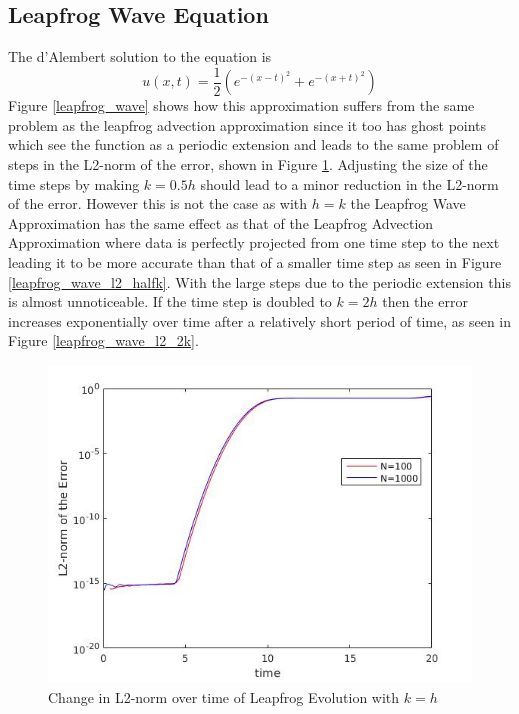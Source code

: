 \subsection{Leapfrog Wave Equation}
The d'Alembert solution to the equation is
\begin{equation}
u(x,t) = \frac{1}{2}(e^{-(x-t)^2} + e^{-(x+t)^2})
\end{equation}
Figure \ref{leapfrog_wave} shows how this approximation suffers from the same problem as the leapfrog advection approximation since it too has ghost points which see the function as a periodic extension and leads to the same problem of steps in the L2-norm of the error, shown in Figure \ref{leapfrog_wave_l2}. Adjusting the size of the time steps by making $k=0.5h$ should lead to a minor reduction in the L2-norm of the error. However this is not the case as with $h=k$ the Leapfrog Wave Approximation has the same effect as that of the Leapfrog Advection Approximation where data is perfectly projected from one time step to the next leading it to be more accurate than that of a smaller time step as seen in Figure \ref{leapfrog_wave_l2_halfk}. With the large steps due to the periodic extension this is almost unnoticeable. If the time step is doubled to $k=2h$ then the error increases exponentially over time after a relatively short period of time, as seen in Figure \ref{leapfrog_wave_l2_2k}.
\begin{figure}[H]
 \centering
 \includegraphics[scale=0.5]{Images/leapfrog_wave_l2.jpg}
 \caption{Change in L2-norm over time of Leapfrog Evolution with $k = h$}
 \label{leapfrog_wave_l2}
\end{figure}
